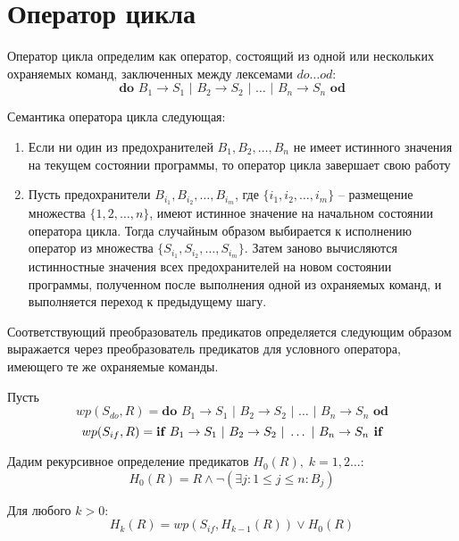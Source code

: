 \section{Оператор цикла}
\newcommand{\DO}{\textbf{do } B_1 \rightarrow S_1 \text{ | } B_2 \rightarrow S_2 \text{ | } \ldots \text{ | } B_n \rightarrow S_n \textbf{ od}}
Оператор цикла определим как оператор, состоящий из одной или нескольких охраняемых команд, заключенных между лексемами $do\ldots od$:
\begin{equation}
	\DO
\end{equation}

Семантика оператора цикла следующая:
\begin{enumerate}
	\item Если ни один из предохранителей $B_1, B_2, \ldots, B_n$ не имеет истинного значения на текущем состоянии программы, 
	то оператор цикла завершает свою работу
	\item Пусть предохранители $B_{i_1}, B_{i_2},\ldots, B_{i_m}$, где $\{i_1, i_2, \ldots, i_m\}$ -- размещение 
	множества $\{1, 2, \ldots, n\}$, имеют истинное значение на начальном состоянии оператора цикла.
	Тогда случайным образом выбирается к исполнению оператор из множества $\{S_{i_1}, S_{i_2}, \ldots, S_{i_m}\}$.
	Затем заново вычисляются истинностные значения всех предохранителей на новом состоянии программы,
	полученном после выполнения одной из охраняемых команд, и выполняется переход к предыдущему шагу.
\end{enumerate}

Соответствующий преобразователь предикатов определяется следующим образом выражается через преобразователь предикатов
для условного оператора, имеющего те же охраняемые команды.

Пусть
\begin{equation}
	wp(S_{do}, R) = \DO
\end{equation}
\begin{equation}
	wp(S_{if}, R) = \textbf{if } B_1 \rightarrow S_1 \text{ | } B_2 \rightarrow S_2 \text{ | } \ldots \text{ | } B_n \rightarrow S_n \textbf{ if}
\end{equation}

Дадим рекурсивное определение предикатов $H_0(R), \; k = 1, 2\ldots$:
\begin{equation}
	H_0(R) = R \wedge \neg (\exists j: 1 \leq j \leq n: B_j)
\end{equation}
\item Для любого $k > 0$:
\begin{equation}
	H_k(R) = wp(S_{if}, H_{k-1}(R)) \vee H_0(R)
\end{equation}

